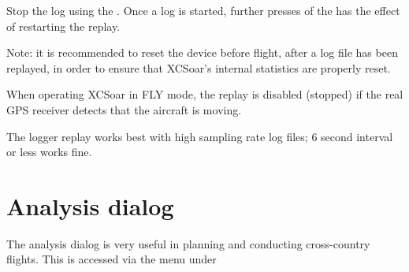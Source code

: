 \documentclass[a4paper,12pt]{refrep}
\begin{document}
Stop the log using the .
Once a log is started, further presses of the  has the
effect of restarting the replay.

Note: it is recommended to reset the device before flight, after a log
file has been replayed, in order to ensure that XCSoar's internal
statistics are properly reset.

When operating XCSoar in FLY mode, the replay is disabled (stopped) if
the real GPS receiver detects that the aircraft is moving.

The logger replay works best with high sampling rate log files;
6 second interval or less works fine.

\section{Analysis dialog}\label{sec:analysis-dialog-climb}

The analysis dialog is very useful in planning and conducting
cross-country flights.  This is accessed via the menu under
\begin{quote}
\blink{}
\end{quote}
\end{document}
